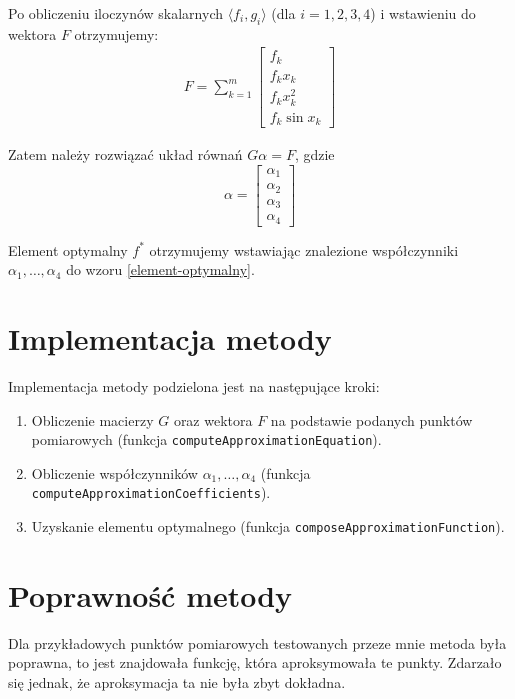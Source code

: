 \documentclass[12pt]{article}
\begin{document}
	 Po obliczeniu iloczynów skalarnych $\langle f_i, g_i \rangle$ (dla $i = 1, 2, 3, 4$) i wstawieniu do wektora $F$ otrzymujemy:
	 \begin{align*}
		 F = \sum_{k=1}^{m}
		 \begin{bmatrix}
		 	f_k          \\
		 	f_k x_k      \\
		 	f_k x_k^2    \\
		 	f_k \sin x_k
		 \end{bmatrix}
	 \end{align*}
	 
	 Zatem należy rozwiązać układ równań $G\alpha = F$, gdzie
	 $$
 	\alpha = 
 	\begin{bmatrix}
 		\alpha_1 \\
 		\alpha_2 \\
 		\alpha_3 \\
 		\alpha_4
 	\end{bmatrix}
	 $$
	 
	Element optymalny $f^*$ otrzymujemy wstawiając znalezione współczynniki $\alpha_1, \dots, \alpha_4$ do wzoru \eqref{element-optymalny}.
	
	
	
	\section{Implementacja metody}
	Implementacja metody podzielona jest na następujące kroki:
	\begin{enumerate}
		\item Obliczenie macierzy $G$ oraz wektora $F$ na podstawie podanych punktów pomiarowych (funkcja \texttt{computeApproximationEquation}).
		\item Obliczenie współczynników $\alpha_1, \dots, \alpha_4$ (funkcja \texttt{computeApproximationCoefficients}).
		\item Uzyskanie elementu optymalnego (funkcja \texttt{composeApproximationFunction}).
	\end{enumerate}

	
	
	\section{Poprawność metody}
	Dla przykładowych punktów pomiarowych testowanych przeze mnie metoda była poprawna, to jest znajdowała funkcję, która aproksymowała te punkty. Zdarzało się jednak, że aproksymacja ta nie była zbyt dokładna.
	
\end{document}

